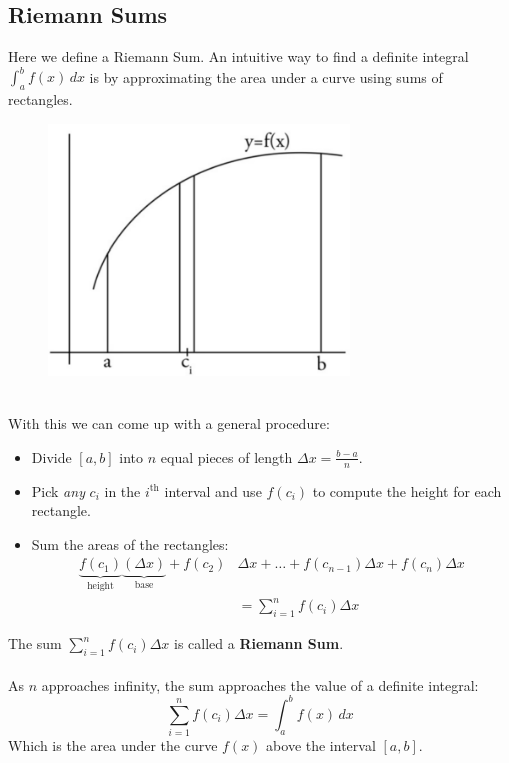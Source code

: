 \documentclass{report}
\begin{document}
\subsection{Riemann Sums} %
Here we define a Riemann Sum. An intuitive way to find a definite integral 
$\int_a^bf(x)\,dx$ is by approximating the area under a curve using sums
of rectangles.
\begin{figure}[h]
\includegraphics[width=8cm]{Capture29}\\
\centering
{}
\end{figure}\\
With this we can come up with a general procedure:
\begin{itemize}
\item Divide $[a,b]$ into $n$ equal pieces of length 
$\Delta x=\frac{b-a}{n}$.
\item Pick \textit{any} $c_i$ in the $i^{\text{th}}$ interval and use $f(c_i)$
to compute the height for each rectangle.
\item Sum the areas of the rectangles:
\begin{align*}
\underbrace{f(c_1)}_{\text{height}}\underbrace{(\Delta x)}_{\text{base}}
+f(c_2)&\Delta x+\ldots+f(c_{n-1})\Delta x+f(c_n)\Delta x\\
&=\sum_{i=1}^nf(c_i)\Delta x
\end{align*}
\end{itemize}
The sum $\sum_{i=1}^nf(c_i)\Delta x$ is called a \textbf{Riemann Sum}.\\
\vspace{1mm}\\
As $n$ approaches infinity, the sum approaches the value of a definite integral:
\begin{equation*}
\sum_{i=1}^nf(c_i)\Delta x=\int_a^bf(x)\,dx
\end{equation*}
Which is the area under the curve $f(x)$ above the interval $[a,b]$.
\newpage
\end{document}

